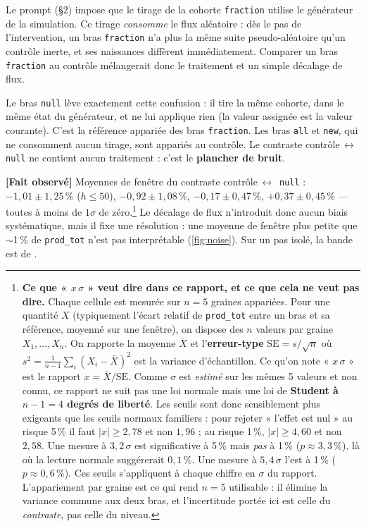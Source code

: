 \documentclass[11pt,a4paper]{article}
\newcommand{\code}[1]{\texttt{#1}}
\newcommand{\fait}{\textbf{[Fait observé]}}
\begin{document}
Le prompt (§2) impose que le tirage de la cohorte \code{fraction} utilise
le générateur de la simulation. Ce tirage \emph{consomme} le flux
aléatoire : dès le pas de l'intervention, un bras \code{fraction} n'a plus
la même suite pseudo-aléatoire qu'un contrôle inerte, et ses naissances
diffèrent immédiatement. Comparer un bras \code{fraction} au contrôle
mélangerait donc le traitement et un simple décalage de flux.

Le bras \code{null} lève exactement cette confusion : il tire la même
cohorte, dans le même état du générateur, et ne lui applique rien (la
valeur assignée est la valeur courante). C'est la référence appariée des
bras \code{fraction}. Les bras \code{all} et \code{new}, qui ne consomment
aucun tirage, sont appariés au contrôle. Le contraste
contrôle\,$\leftrightarrow$\,\code{null} ne contient aucun traitement :
c'est le \textbf{plancher de bruit}.

\fait{} Moyennes de fenêtre du contraste contrôle\,$\leftrightarrow$\,%
\code{null} : $-1{,}01\pm1{,}25$\,\% ($h\le50$), $-0{,}92\pm1{,}08$\,\%,
$-0{,}17\pm0{,}47$\,\%, $+0{,}37\pm0{,}45$\,\% --- toutes à moins de
$1\sigma$ de zéro.\footnote{\label{note:sigma}\textbf{Ce que « $x\,\sigma$ »
veut dire dans ce rapport, et ce que cela ne veut pas dire.} Chaque cellule
est mesurée sur $n = 5$ graines appariées. Pour une quantité $X$ (typiquement
l'écart relatif de \code{prod\_tot} entre un bras et sa référence, moyenné
sur une fenêtre), on dispose des $n$ valeurs par graine $X_1,\dots,X_n$. On
rapporte la moyenne $\bar X$ et l'\textbf{erreur-type}
$\mathrm{SE} = s/\sqrt{n}$ où $s^2 = \frac{1}{n-1}\sum_i (X_i-\bar X)^2$ est
la variance d'échantillon. Ce qu'on note « $x\,\sigma$ » est le rapport
$x = \bar X / \mathrm{SE}$. Comme $\sigma$ est \emph{estimé} sur les mêmes
5 valeurs et non connu, ce rapport ne suit pas une loi normale mais une loi
de \textbf{Student à $n-1 = 4$ degrés de liberté}. Les seuils sont donc
sensiblement plus exigeants que les seuils normaux familiers : pour rejeter
« l'effet est nul » au risque 5\,\% il faut $|x| \ge 2{,}78$ et non
$1{,}96$ ; au risque 1\,\%, $|x| \ge 4{,}60$ et non $2{,}58$. Une mesure à
$3{,}2\,\sigma$ est significative à 5\,\% mais \emph{pas} à 1\,\%
($p \approx 3{,}3\,\%$), là où la lecture normale suggérerait $0{,}1\,\%$.
Une mesure à $5{,}4\,\sigma$ l'est à 1\,\% ($p \approx 0{,}6\,\%$). Ces
seuils s'appliquent à chaque chiffre en $\sigma$ du rapport. L'appariement
par graine est ce qui rend $n=5$ utilisable : il élimine la variance
commune aux deux bras, et l'incertitude portée ici est celle du
\emph{contraste}, pas celle du niveau.} Le décalage de flux n'introduit donc aucun biais
systématique, mais il fixe une résolution : une moyenne de fenêtre plus
petite que $\sim$1\,\% de \code{prod\_tot} n'est pas interprétable
(\autoref{fig:noise}). Sur un pas isolé, la bande est de
\unskip.
\end{document}
